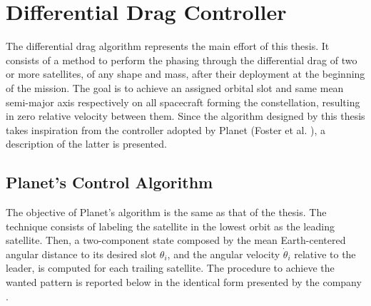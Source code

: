 \section{Differential Drag Controller} \label{differential_drag_control_par}
The differential drag algorithm represents the main effort of this thesis.
It consists of a method to perform the phasing through the differential drag of two or more satellites, of any shape and mass, after their deployment at the beginning of the mission.
The goal is to achieve an assigned orbital slot and same mean semi-major axis respectively on all spacecraft forming the constellation, resulting in zero relative velocity between them.
Since the algorithm designed by this thesis takes inspiration from the controller adopted by Planet (Foster et al. \cite{foster2015orbit}), a description of the latter is presented.

\subsection{Planet's Control Algorithm} \label{planet_algorithm_par}
The objective of Planet's algorithm is the same as that of the thesis.
The technique consists of labeling the satellite in the lowest orbit as the leading satellite.
Then, a two-component state composed by the mean Earth-centered angular distance to its desired slot $\theta_i$, and the angular velocity $\dot{\theta}_i$ relative to the leader, is computed for each trailing satellite.
The procedure to achieve the wanted pattern is reported below in the identical form presented by the company \cite{foster2015orbit}.

